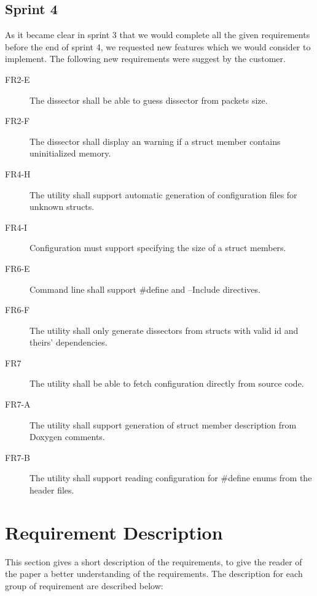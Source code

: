 \subsection{Sprint 4}
\label{sec:req:sprint4evo}
As it became clear in sprint 3 that we would complete all the given
requirements before the end of sprint 4, we requested new features which we
would consider to implement. The following new requirements were suggest by
the customer.
\begin{description}
	\item[FR2-E] The \gls{dissector} shall be able to guess dissector from packets size.
	\item[FR2-F] The \gls{dissector} shall display an warning if a struct member contains uninitialized memory.
	\item[FR4-H] The utility shall support automatic generation of configuration files for unknown structs.
	\item[FR4-I] Configuration must support specifying the size of a struct members.
	\item[FR6-E] Command line shall support \#define and --Include directives.
	\item[FR6-F] The utility shall only generate dissectors from structs with valid id and theirs' dependencies.
	\item[FR7] The utility shall be able to fetch configuration directly from source code.
	\item[FR7-A] The utility shall support generation of struct member description from Doxygen comments.
	\item[FR7-B] The utility shall support reading configuration for \#define enums from the header files.
\end{description}


\section{Requirement Description}
\label{sec:req:desc}
This section gives a short description of the requirements, to give the reader 
of the paper a better understanding of the requirements. The description for 
each group of requirement are described below:

